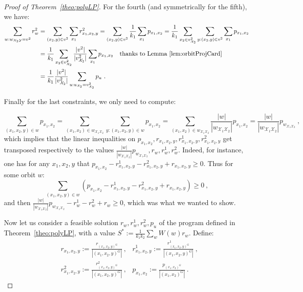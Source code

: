 \documentclass[11pt]{article}
\theoremstyle{definition}
\theoremstyle{remark}
\begin{document}
\begin{proof}[Proof of Theorem~\ref{theo:polyLP}]
   For the fourth (and symmetrically for the fifth), we have:
   \begin{equation}
     \begin{aligned}
       \sum_{w:w_{\mathcal{X}_2\mathcal{Y}}=v^2} r^2_w &= \sum_{(x_2,y) \in v^2} \sum_{x_1} r^2_{x_1,x_2,y} = \sum_{(x_2,y) \in v^2} \frac{1}{k_1} \sum_{x_1} p_{x_1,x_2} = \frac{1}{k_1} \sum_{x_2 \in v^2_{\mathcal{X}_2}} \sum_{y: (x_2,y) \in v^2} \sum_{x_1} p_{x_1,x_2}\\
       &= \frac{1}{k_1} \sum_{x_2 \in v^2_{\mathcal{X}_2}} \frac{|v^2|}{|v^2_{\mathcal{X}_2}|} \sum_{x_1} p_{x_1,x_2} \quad \text{thanks to Lemma~\ref{lem:orbitProjCard}}\\
       &= \frac{1}{k_1}\frac{|v^2|}{|v^2_{\mathcal{X}_2}|} \sum_{u:u_{\mathcal{X}_2}=v^2_{\mathcal{X}_2}} p_u \ .
     \end{aligned}
   \end{equation}

   Finally for the last constraints, we only need to compute:

   \[ \sum_{(x_1,x_2,y) \in w} p_{x_1,x_2} = \sum_{(x_1,x_2) \in w_{\mathcal{X}_1\mathcal{X}_2}} \sum_{y : (x_1,x_2,y) \in w} p_{x_1,x_2} = \sum_{(x_1,x_2) \in w_{\mathcal{X}_1\mathcal{X}_2}} \frac{|w|}{|w_{\mathcal{X}_1\mathcal{X}_2}|} p_{x_1,x_2} = \frac{|w|}{|w_{\mathcal{X}_1\mathcal{X}_2}|} p_{w_{\mathcal{X}_1\mathcal{X}_2}} \ ,\]
   which implies that the linear inequalities on $p_{x_1,x_2}, r_{x_1,x_2,y}, r^1_{x_1,x_2,y}, r^2_{x_1,x_2,y}$ get transposed respectively to the values $\frac{|w|}{|w_{\mathcal{X}_1\mathcal{X}_2}|} p_{w_{\mathcal{X}_1\mathcal{X}_2}}, r_w, r^1_w, r^2_w$. Indeed, for instance, one has for any $x_1,x_2,y$ that $p_{x_1,x_2}- r^1_{x_1,x_2,y}- r^2_{x_1,x_2,y} + r_{x_1,x_2,y} \geq 0$. Thus for some orbit $w$:
   \[\sum_{(x_1,x_2,y) \in w}\left(p_{x_1,x_2}- r^1_{x_1,x_2,y}- r^2_{x_1,x_2,y} + r_{x_1,x_2,y}\right) \geq 0 \ ,\]
   and then $ \frac{|w|}{|w_{\mathcal{X}_1\mathcal{X}_2}|} p_{w_{\mathcal{X}_1\mathcal{X}_2}}- r^1_w- r^2_w + r_w \geq 0$, which was what we wanted to show.

   Now let us consider a feasible solution  $r_w,r^1_w,r^2_w,p_u$ of the program defined in Theorem~\ref{theo:polyLP}, with a value $S^*:=\frac{1}{k_1k_2}\sum_{w} W(w)r_w$. Define:
  \begin{equation}
    \begin{aligned}
      &r_{x_1,x_2,y} := \frac{r_{(x_1,x_2,y)^G}}{|(x_1,x_2,y)^G|} \ , &r^1_{x_1,x_2,y} := \frac{r^1_{(x_1,x_2,y)^G}}{|(x_1,x_2,y)^G|} \ ,\\
      &r^2_{x_1,x_2,y} :=\frac{r^2_{(x_1,x_2,y)^G}}{|(x_1,x_2,y)^G|} \ , &p_{x_1,x_2} := \frac{p_{(x_1,x_2)^G}}{|(x_1,x_2)^G|} \ .
    \end{aligned}
  \end{equation}


\end{proof}
\end{document}

